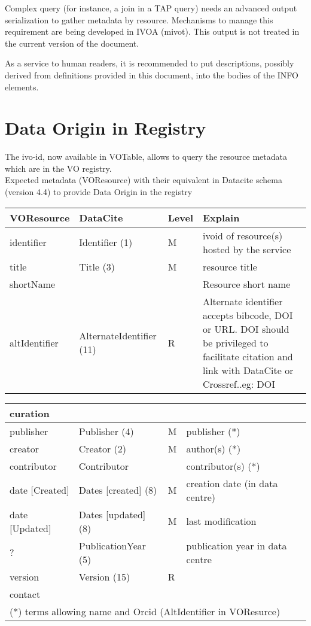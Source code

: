 \documentclass[11pt,a4paper]{ivoa}
\begin{document}
Complex query (for instance, a join in a TAP query) needs an advanced output serialization to gather metadata by resource.
Mechanisms to manage this requirement are being developed in IVOA (mivot).
This output is not treated in the current version of the document.

As a service to human readers, it is recommended to put descriptions, possibly derived from definitions provided in this document, into the bodies of the INFO elements.


\section{Data Origin in Registry}
The ivo-id, now available in VOTable, allows to query the resource metadata which are in the VO registry.\\


Expected metadata (VOResource) with their equivalent in Datacite schema (version 4.4) to provide Data Origin in the registry\\

\begin{tabular}{|p{3cm}|p{4cm}|p{1cm}|p{5cm}|} \hline
\textbf{VOResource} & \textbf{DataCite} & \textbf{Level} & \textbf{Explain} \\ \hline
identifier    &Identifier (1) &M & ivoid of resource(s) hosted by the service\\ \hline
title         &Title (3) &M  & resource title\\ \hline
shortName     &&& Resource short name\\ \hline
altIdentifier & AlternateIdentifier (11)& R &
              Alternate identifier accepts bibcode, DOI or URL. DOI should be privileged to facilitate citation and link with DataCite or Crossref..eg: DOI \\ \hline
\end{tabular}

\begin{tabular}{|p{3cm}|p{4cm}|p{1cm}|p{5cm}|} \hline
\multicolumn{4}{|l|}{\textbf{curation}} \\ \hline
publisher     & Publisher (4) & M &publisher (*)\\ \hline
creator       & Creator (2) & M & author(s) (*)\\ \hline
contributor   & Contributor & & contributor(s) (*)\\ \hline
date [Created]& Dates [created] (8)& M & creation date (in data centre)\\ \hline
date [Updated]& Dates [updated] (8)& M & last modification\\ \hline
  ?            & PublicationYear (5) & & publication year in data centre\\ \hline
version       & Version (15) & R &\\ \hline
contact       & &&\\ \hline
\multicolumn{4}{l}{\small \footnotesize(*) terms allowing name and Orcid (AltIdentifier in VOResurce)} \\
\end{tabular}
\end{document}
